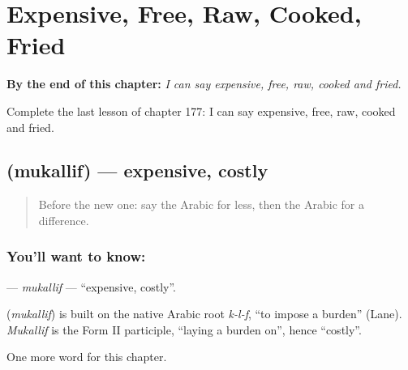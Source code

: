 
\chapter{Expensive, Free, Raw, Cooked, Fried}
\label{ch:ar-expensive-free-raw-cooked-fried}

\begin{chapteropening}
\textbf{By the end of this chapter:} \emph{I can say expensive, free, raw, cooked and fried.}

Complete the last lesson of chapter 177: I can say expensive, free, raw, cooked and fried.
\end{chapteropening}

\section[\texorpdfstring{\ar{مكلف} (mukallif)}{مكلف (mukallif)}]{ (mukallif) — expensive, costly}

\label{lesson:AR-C177-mukallif}



\begin{quote}
Before the new one: say the Arabic for less, then the Arabic for a difference.
\end{quote}

\subsection*{You'll want to know: }
\textbf{} — \emph{mukallif} — \textquotedblleft{}expensive, costly\textquotedblright{}.

\begin{cousinweb}
\textbf{} (\emph{mukallif}) is built on the native Arabic root \emph{k-l-f}, \textquotedblleft{}to impose a burden\textquotedblright{} (Lane). \emph{Mukallif} is the Form II participle, \textquotedblleft{}laying a burden on\textquotedblright{}, hence \textquotedblleft{}costly\textquotedblright{}.
\end{cousinweb}

\begin{grammarlens}[title={What you've built}]
One more word for this chapter.
\end{grammarlens}

